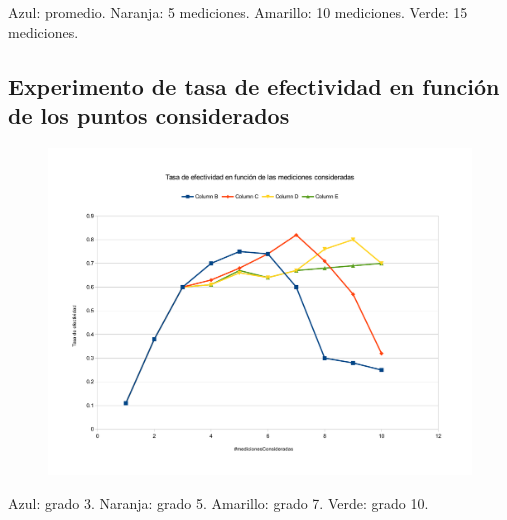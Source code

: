 Azul: promedio. Naranja: 5 mediciones. Amarillo: 10 mediciones. Verde: 15 mediciones.
\subsection{Experimento de tasa de efectividad en función de los puntos considerados}
\begin{figure}[H]{}
\centering
\includegraphics[scale=0.5]{graphs/TEvsMedicionesRECU.pdf}
\label{TEvsPac}
\end{figure}

Azul: grado 3. Naranja: grado 5. Amarillo: grado 7. Verde: grado 10.

